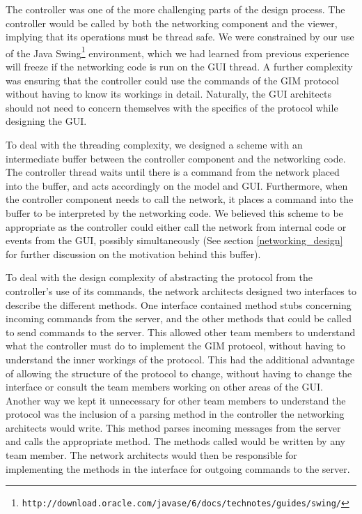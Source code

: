The controller was one of the more challenging parts of the design process. The controller would be called by both the networking component and the viewer, implying that its operations must be thread safe. We were constrained by our use of the Java Swing\footnote{\texttt{http://download.oracle.com/javase/6/docs/technotes/guides/swing/}} environment, which we had learned from previous experience will freeze if the networking code is run on the GUI thread. A further complexity was ensuring that the controller could use the commands of the GIM protocol without having to know its workings in detail. Naturally, the GUI architects should not need to concern themselves with the specifics of the protocol while designing the GUI.

To deal with the threading complexity, we designed a scheme with an intermediate buffer between the controller component and the networking code. The controller thread waits until there is a command from the network placed into the buffer, and acts accordingly on the model and GUI. Furthermore, when the controller component needs to call the network, it places a command into the buffer to be interpreted by the networking code. We believed this scheme to be appropriate as the controller could either call the network from internal code or events from the GUI, possibly simultaneously (See section \ref{networking_design} for further discussion on the motivation behind this buffer).

To deal with the design complexity of abstracting the protocol from the controller's use of its commands, the network architects designed two interfaces to describe the different methods. One interface contained method stubs concerning incoming commands from the server, and the other methods that could be called to send commands to the server. This allowed other team members to understand what the controller must do to implement the GIM protocol, without having to understand the inner workings of the protocol. This had the additional advantage of allowing the structure of the protocol to change, without having to change the interface or consult the team members working on other areas of the GUI. Another way we kept it unnecessary for other team members to understand the protocol was the inclusion of a parsing method in the controller the networking architects would write. This method parses incoming messages from the server and calls the appropriate method. The methods called would be written by any team member. The network architects would then be responsible for implementing the methods in the interface for outgoing commands to the server.

